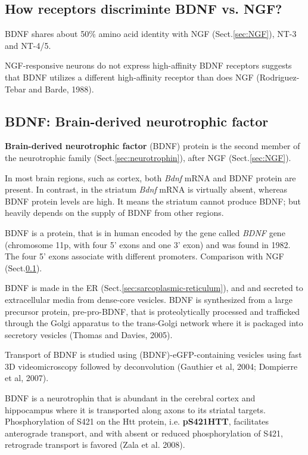 \subsection{How receptors discriminte BDNF vs. NGF?}
\label{sec:BDNF-vs-NGF}
\label{sec:NGF-vs-BDNF}

BDNF shares about 50\% amino acid identity with NGF (Sect.\ref{sec:NGF}), NT-3
and NT-4/5.

NGF-responsive neurons do not express high-affinity
BDNF receptors suggests that BDNF utilizes a different
high-affinity receptor than does NGF (Rodriguez-Tebar
and Barde, 1988).


\subsection{BDNF: Brain-derived neurotrophic factor}
\label{sec:BDNF}

{\bf Brain-derived neurotrophic factor} (BDNF) protein is the second member of
the neurotrophic family (Sect.\ref{sec:neurotrophin}), after NGF
(Sect.\ref{sec:NGF}). 

In most brain regions, such as cortex, both {\it Bdnf} mRNA and BDNF protein are
present. In contrast, in the striatum {\it Bdnf} mRNA is virtually absent,
whereas BDNF protein levels are high. It means the striatum cannot produce BDNF;
but heavily depends on the supply of BDNF from other regions. 

\begin{mdframed}

BDNF is a protein, that is in human encoded by the gene called {\it BDNF} gene
(chromosome 11p, with four 5' exons and one 3' exon) and was found in 1982.
The four 5' exons associate with different promoters. Comparison with NGF
(Sect.\ref{sec:BDNF-vs-NGF}).

BDNF is made in the ER (Sect.\ref{sec:sarcoplasmic-reticulum}), and and secreted
to extracellular media from dense-core vesicles.
BDNF is synthesized from a large precursor protein, pre-pro-BDNF, that is
proteolytically processed and trafficked through the Golgi apparatus to the
trans-Golgi network where it is packaged into secretory vesicles (Thomas and
Davies, 2005).  

Transport of BDNF is studied using (BDNF)-eGFP-containing vesicles using fast 3D
videomicroscopy followed by deconvolution  (Gauthier et al, 2004; Dompierre et
al, 2007).

BDNF is a neurotrophin that is abundant in the cerebral cortex and hippocampus
where it is transported along axons to its striatal targets.
Phosphorylation of S421 on the Htt protein, i.e. {\bf pS421HTT}, facilitates
anterograde transport, and with absent or reduced phosphorylation of S421,
retrograde transport is favored (Zala et al.
2008).
\end{mdframed}

